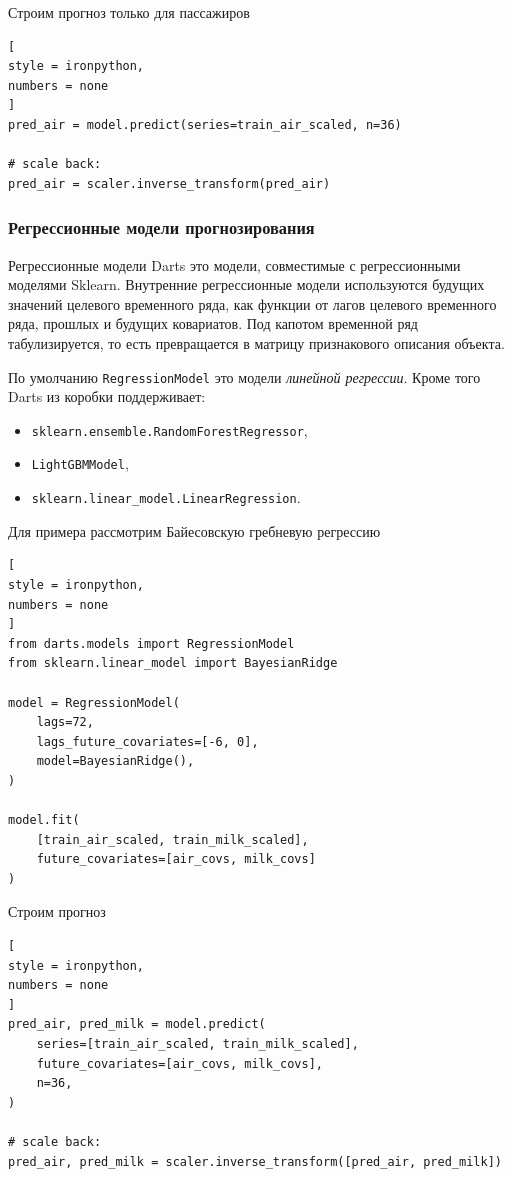 \documentclass[%
	11pt,
	a4paper,
	utf8,
		]{article}
\begin{document}
Строим прогноз только для пассажиров
\begin{lstlisting}[
style = ironpython,
numbers = none
]
pred_air = model.predict(series=train_air_scaled, n=36)

# scale back:
pred_air = scaler.inverse_transform(pred_air)
\end{lstlisting}

\subsubsection{Регрессионные модели прогнозирования}

Регрессионные модели Darts это модели, совместимые с регрессионными моделями Sklearn. Внутренние регрессионные модели используются будущих значений целевого временного ряда, как функции от лагов целевого временного ряда, прошлых и будущих ковариатов. Под капотом временной ряд табулизируется, то есть превращается в матрицу признакового описания объекта.

По умолчанию \verb|RegressionModel| это модели \emph{линейной регрессии}. Кроме того Darts из коробки поддерживает:
\begin{itemize}
	\item \verb|sklearn.ensemble.RandomForestRegressor|,
	
	\item \verb|LightGBMModel|,
	
	\item \verb|sklearn.linear_model.LinearRegression|.
\end{itemize}

Для примера рассмотрим Байесовскую гребневую регрессию
\begin{lstlisting}[
style = ironpython,
numbers = none
]
from darts.models import RegressionModel
from sklearn.linear_model import BayesianRidge

model = RegressionModel(
    lags=72,
    lags_future_covariates=[-6, 0],
    model=BayesianRidge(),
)

model.fit(
    [train_air_scaled, train_milk_scaled],
    future_covariates=[air_covs, milk_covs]
)
\end{lstlisting}

Строим прогноз
\begin{lstlisting}[
style = ironpython,
numbers = none
]
pred_air, pred_milk = model.predict(
	series=[train_air_scaled, train_milk_scaled],
	future_covariates=[air_covs, milk_covs],
	n=36,
)

# scale back:
pred_air, pred_milk = scaler.inverse_transform([pred_air, pred_milk])
\end{lstlisting}
\end{document}
